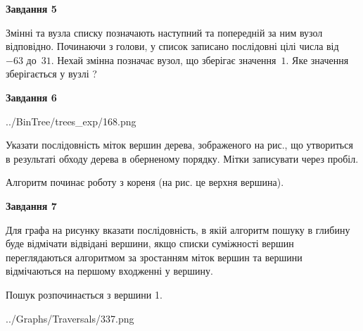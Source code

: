 \documentclass[12pt, ukrainian]{article}
\begin{document}
{\begin {large}
{\begin {center}\textbf{Завдання 5}\end {center}}\par
Змінні  та  вузла списку позначають наступний та попередній за ним вузол відповідно. Починаючи з голови, у список записано послідовні цілі числа від~$-63$ до~$31$. Нехай змінна  позначає вузол, що зберігає значення~$1$.
Яке значення зберігається у вузлі  ?\par
\newpage

{\begin {center}\textbf{Завдання 6}\end {center}}\par

\begin{center}
	{../BinTree/trees_exp/168.png}
\end{center}
Указати послідовність міток вершин дерева, зображеного на рис., що утвориться в результаті обходу дерева в оберненому порядку. Мітки записувати через пробіл.\par Алгоритм починає роботу з кореня (на рис. це верхня вершина).\par
\newpage

{\begin {center}\textbf{Завдання 7}\end {center}}\par
Для графа на рисунку вказати послідовність, в якій алгоритм пошуку в глибину буде відмічати відвідані вершини, якщо списки суміжності вершин переглядаються алгоритмом за зростанням міток вершин та вершини відмічаються на першому вход\-женні у вершину.\par
Пошук розпочинається з вершини 1.\par

\begin{center}
	{../Graphs/Traversals/337.png}
\end{center}\par
\newpage


\end{large}}
\end{document}
